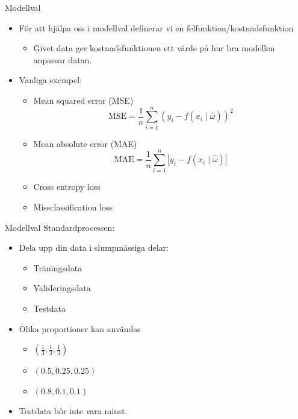 \documentclass[10pt,english]{beamer}
\begin{document}
\begin{frame}{Modellval}
    \begin{itemize}
        \item För att hjälpa oss i modellval definerar vi en felfunktion/kostnadsfunktion
        \begin{itemize}
            \item Givet data ger kostnadsfunktionen ett värde på hur bra modellen anpassar datan.
        \end{itemize}
        \item Vanliga exempel:
        \begin{itemize}
            \item Mean squared error (MSE)
            \begin{equation*}
                \text{MSE} = \frac{1}{n} \sum_{i=1}^{n} \left(y_i - f(x_i \mid \hat{\omega})\right)^2
            \end{equation*}
            \item Mean absolute error (MAE)
            \begin{equation*}
                \text{MAE} = \frac{1}{n} \sum_{i=1}^{n} \left| y_i - f(x_i \mid \hat{\omega}) \right|
            \end{equation*}
            \item Cross entropy loss
            \item Missclassification loss
        \end{itemize}
    \end{itemize}
\end{frame}

\begin{frame}{Modellval}
    Standardprocessen:
    \begin{itemize}
        \item Dela upp din data i slumpmässiga delar:
        \begin{itemize}
            \item Träningsdata
            \item Valideringsdata
            \item Testdata
        \end{itemize}
        \item Olika proportioner kan användas
        \begin{itemize}
            \item $(\tfrac{1}{3}, \tfrac{1}{3}, \tfrac{1}{3})$
            \item $(0.5, 0.25, 0.25)$
            \item $(0.8, 0.1, 0.1)$
        \end{itemize}
        \item Testdata bör inte vara minst.
    \end{itemize}
\end{frame}
\end{document}
